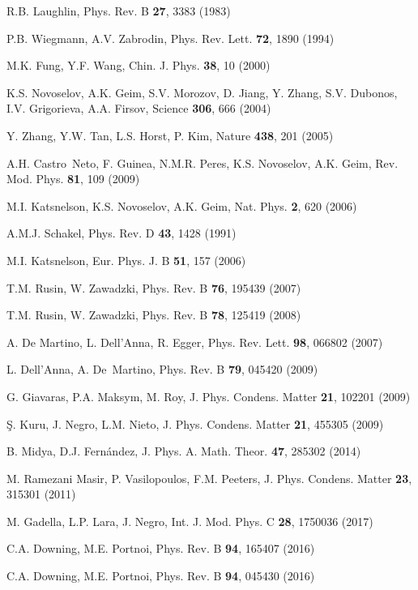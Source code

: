 \documentclass[aps,showpacs,showkeys]{revtex4}
\begin{document}
\begin{thebibliography}{10}
R.B. Laughlin,  Phys. Rev. B {\bf 27}, 3383 (1983)

P.B. Wiegmann, A.V. Zabrodin, Phys. Rev. Lett. {\bf 72}, 1890 (1994)

M.K. Fung, Y.F. Wang, Chin. J. Phys. {\bf 38}, 10 (2000)

K.S. Novoselov, A.K. Geim, S.V. Morozov, D. Jiang, Y. Zhang, S.V. Dubonos, I.V.  Grigorieva,  A.A. Firsov,
 Science {\bf 306}, 666 (2004)

Y. Zhang, Y.W. Tan, L.S. Horst,  P. Kim, Nature {\bf 438}, 201 (2005)

A.H. Castro~Neto, F. Guinea, N.M.R. Peres, K.S. Novoselov,  A.K. Geim,
 Rev. Mod. Phys. {\bf 81}, 109 (2009)

M.I. Katsnelson, K.S. Novoselov,  A.K. Geim, Nat. Phys. {\bf 2}, 620 (2006)

A.M.J. Schakel, Phys. Rev. D {\bf 43}, 1428 (1991)

M.I. Katsnelson,  Eur. Phys. J. B {\bf 51}, 157 (2006)

T.M. Rusin, W. Zawadzki,  Phys. Rev. B {\bf 76}, 195439 (2007)

T.M. Rusin, W. Zawadzki,  Phys. Rev. B {\bf 78}, 125419 (2008)

A. De Martino, L. Dell'Anna,  R. Egger,  Phys. Rev. Lett. {\bf 98}, 066802 (2007)

L. Dell'Anna, A. De~Martino,  Phys. Rev. B {\bf 79}, 045420 (2009)

G. Giavaras, P.A. Maksym,  M. Roy, J. Phys. Condens. Matter {\bf 21}, 102201 (2009)

\c{S}. Kuru, J. Negro, L.M. Nieto, J. Phys. Condens. Matter  {\bf 21}, 455305 (2009)

B. Midya, D.J. Fern{\'{a}}ndez, J. Phys. A. Math. Theor. {\bf 47}, 285302 (2014)

M. Ramezani Masir, P. Vasilopoulos,  F.M. Peeters, J. Phys. Condens. Matter {\bf 23}, 315301 (2011)

M. Gadella, L.P. Lara, J. Negro, Int. J. Mod. Phys. C {\bf 28}, 1750036 (2017)

C.A. Downing, M.E. Portnoi,  Phys. Rev. B  {\bf 94}, 165407 (2016)

C.A. Downing, M.E. Portnoi,  Phys. Rev. B  {\bf 94}, 045430 (2016)


\end{thebibliography}
\end{document}
